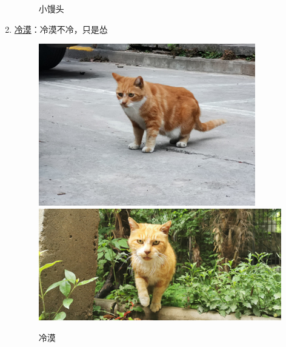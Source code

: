 \documentclass[zihao=-4,fontset=none]{Beautybook-CN}
\begin{document}
\begin{enumerate}
\begin{figure}[htbp]
            \caption{小馒头}
            \label{img5354}
    \end{figure}
            \item \hyperref[img5556]{冷漠}：冷漠不冷，只是怂
    \begin{figure}[htbp]
            \centering
            \includegraphics[width=0.4\linewidth]{media/cimage55.png}
        \qquad
            \includegraphics[width=0.4\linewidth]{media/cimage56.png}
            \caption{冷漠}
            \label{img5556}
    \end{figure}
    \end{enumerate}
\end{document}
